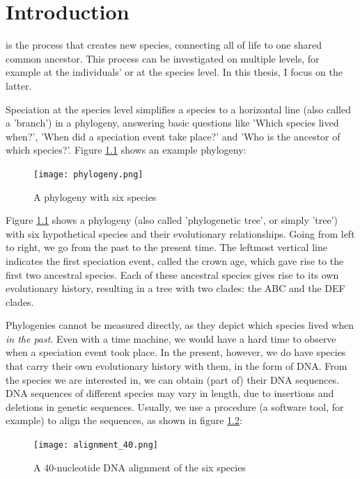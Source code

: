 \chapter{Introduction}
\label{chapter_introduction}

\newpage

\noindent 
{} is the process that creates new species,
connecting all of life to one shared common ancestor. This process
can be investigated on multiple levels, for example at the individuals'
or at the species level. In this thesis, I focus on the latter.

Speciation at the species level simplifies a species to a horizontal 
line (also called a 'branch') in a phylogeny, answering
basic questions like 'Which species lived when?', 'When did a speciation 
event take place?' and 'Who is the ancestor of which species?'. 
Figure \ref{fig:phylogeny} shows an example phylogeny:

\begin{figure}[H]
  \texttt{[image: phylogeny.png]}
  \caption{
    A phylogeny with six species
  }
  \label{fig:phylogeny}
\end{figure}

Figure \ref{fig:phylogeny} shows a phylogeny (also called 'phylogenetic tree', 
or simply 'tree') with six hypothetical species and their evolutionary 
relationships. Going from left to right, we go from the past to the present 
time. The leftmost vertical line indicates the first speciation event, called
the crown age, which gave rise to the first two ancestral species. Each
of these ancestral species gives rise to its own evolutionary history,
resulting in a tree with two clades: the ABC and the DEF clades.

Phylogenies cannot be measured directly, as they depict which species lived
when \emph{in the past}. Even with a time machine, we would have a hard time
to observe when a speciation event took place. In the present, however, we
do have species that carry their own evolutionary history with them, in the
form of DNA. From the species we are interested in, 
we can obtain (part of) their DNA sequences. DNA sequences of different species 
may vary in length, due to insertions and deletions in genetic sequences.
Usually, we use a procedure (a software tool, for example) to align 
the sequences, as shown in figure \ref{fig:alignment}:

\begin{figure}[H]
  \texttt{[image: alignment\_40.png]}
  \caption{
    A 40-nucleotide DNA alignment of the six species
  }
  \label{fig:alignment}
\end{figure}

